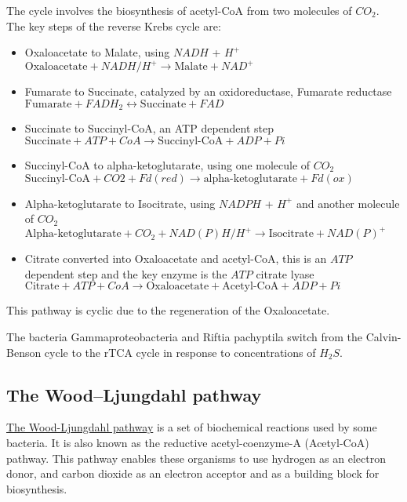 \documentclass{article}
\begin{document}
The cycle involves the biosynthesis of acetyl-CoA from two molecules of $CO_2$. The key
steps of the reverse Krebs cycle are:

\begin{itemize}

    \item Oxaloacetate to Malate, using $NADH$ + $H^+$\\
        $\text{Oxaloacetate} + NADH / H^+ \rightarrow \text{Malate} + NAD^+$
    \item Fumarate to Succinate, catalyzed by an oxidoreductase, Fumarate
        reductase\\
        $\text{Fumarate} + FADH_2 \leftrightarrow \text{Succinate} + FAD$
    \item Succinate to Succinyl-CoA, an ATP dependent step\\
        $\text{Succinate} + ATP + CoA \rightarrow \text{Succinyl-CoA} + ADP + Pi$
    \item Succinyl-CoA to alpha-ketoglutarate, using one molecule of $CO_2$\\
        $\text{Succinyl-CoA} + CO2 + Fd{(red)} \rightarrow \text{alpha-ketoglutarate} + Fd{(ox)}$
    \item Alpha-ketoglutarate to Isocitrate, using $NADPH$ + $H^+$ and another molecule of
        $CO_2$\\
        $\text{Alpha-ketoglutarate} + CO_2 + NAD(P)H/H^+ \rightarrow \text{Isocitrate} + NAD{(P)}^+$
    \item Citrate converted into Oxaloacetate and acetyl-CoA, this is an $\mathit{ATP}$
        dependent step and the key enzyme is the $\mathit{ATP}$ citrate lyase\\
        $\text{Citrate} + ATP + CoA \rightarrow \text{Oxaloacetate} + \text{Acetyl-CoA} + ADP + Pi$
\end{itemize}

This pathway is cyclic due to the regeneration of the Oxaloacetate.

The bacteria Gammaproteobacteria and Riftia pachyptila switch from the Calvin-Benson cycle
to the rTCA cycle in response to concentrations of $H_2S$.

\subsection{The Wood–Ljungdahl pathway}
\href{https://en.wikipedia.org/wiki/Wood-Ljungdahl_pathway}{The Wood-Ljungdahl pathway} is
a set of biochemical reactions used by some bacteria. It is
also known as the reductive acetyl-coenzyme-A (Acetyl-CoA) pathway. This pathway
enables these organisms to use hydrogen as an electron donor, and carbon dioxide as an
electron acceptor and as a building block for biosynthesis.
\end{document}
